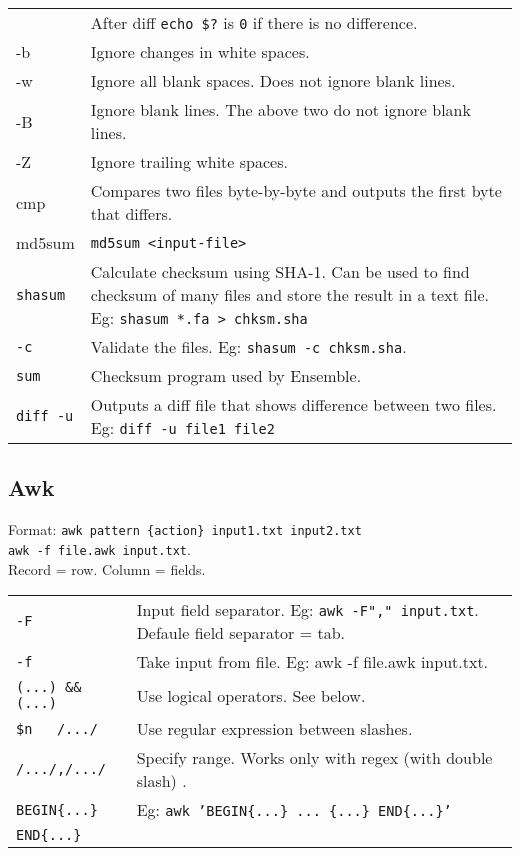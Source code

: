 \begin{tabularx}{\linewidth}{lX}
                            & After diff \texttt{echo \$?}  is \texttt{0} if there is no difference.\\
    -b                      & Ignore changes in white spaces.\\
    -w                      & Ignore all blank spaces. Does not ignore blank lines.\\
    -B                      & Ignore blank lines. The above two do not ignore blank lines.\\
    -Z                      & Ignore trailing white spaces.\\
    \hline
    cmp                     & Compares two files byte-by-byte and outputs the first byte that differs.\\ 
    \hline
    md5sum                  & \texttt{md5sum <input-file>}\\
    \hline
    \texttt{shasum}         & Calculate checksum using SHA-1. Can be used to find checksum of many files and store the result in a text file. Eg: \texttt{shasum *.fa > chksm.sha}\\
    \texttt{-c}             & Validate the files. Eg: \texttt{shasum -c chksm.sha}.\\
    \texttt{sum}            & Checksum program used by Ensemble.\\
    \texttt{diff -u}        & Outputs a diff file that shows difference between two files. Eg: \texttt{diff -u file1 file2}\\
    \hline
\end{tabularx}


\vfill\null
\columnbreak

\subsection{Awk}

Format: \texttt{awk pattern \{action\} input1.txt input2.txt} \\ \texttt{awk -f file.awk input.txt}.\\ Record = row. Column = fields. \\

\begin{tabularx}{\linewidth}{lX}
    \texttt{-F} & Input field separator. Eg: \texttt{awk -F"," input.txt}. Defaule field separator = tab.\\
    \texttt{-f} & Take input from file. Eg: awk -f file.awk input.txt.\\
    \texttt{(...) \&\& (...)} &  Use logical operators. See below.\\
    \texttt{\$n ~ /.../} & Use regular expression between slashes.\\
    \texttt{/.../,/.../} & Specify range. Works only with regex (with double slash) .\\
    \texttt{BEGIN\{...\}} & Eg: \texttt{awk 'BEGIN\{...\} ... \{...\} END\{...\}'}\\
    \texttt{END\{...\}} & \\
    \hline
\end{tabularx}

